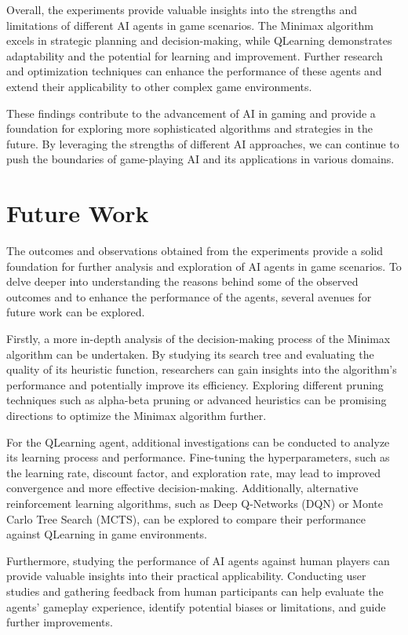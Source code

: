 \documentclass{article}
\begin{document}
Overall, the experiments provide valuable insights into the strengths and limitations of different AI agents in game scenarios. The Minimax algorithm excels in strategic planning and decision-making, while QLearning demonstrates adaptability and the potential for learning and improvement. Further research and optimization techniques can enhance the performance of these agents and extend their applicability to other complex game environments.

These findings contribute to the advancement of AI in gaming and provide a foundation for exploring more sophisticated algorithms and strategies in the future. By leveraging the strengths of different AI approaches, we can continue to push the boundaries of game-playing AI and its applications in various domains.


\section{Future Work}
The outcomes and observations obtained from the experiments provide a solid foundation for further analysis and exploration of AI agents in game scenarios. To delve deeper into understanding the reasons behind some of the observed outcomes and to enhance the performance of the agents, several avenues for future work can be explored.

Firstly, a more in-depth analysis of the decision-making process of the Minimax algorithm can be undertaken. By studying its search tree and evaluating the quality of its heuristic function, researchers can gain insights into the algorithm's performance and potentially improve its efficiency. Exploring different pruning techniques such as alpha-beta pruning or advanced heuristics can be promising directions to optimize the Minimax algorithm further.

For the QLearning agent, additional investigations can be conducted to analyze its learning process and performance. Fine-tuning the hyperparameters, such as the learning rate, discount factor, and exploration rate, may lead to improved convergence and more effective decision-making. Additionally, alternative reinforcement learning algorithms, such as Deep Q-Networks (DQN) or Monte Carlo Tree Search (MCTS), can be explored to compare their performance against QLearning in game environments.

Furthermore, studying the performance of AI agents against human players can provide valuable insights into their practical applicability. Conducting user studies and gathering feedback from human participants can help evaluate the agents' gameplay experience, identify potential biases or limitations, and guide further improvements.
\end{document}

